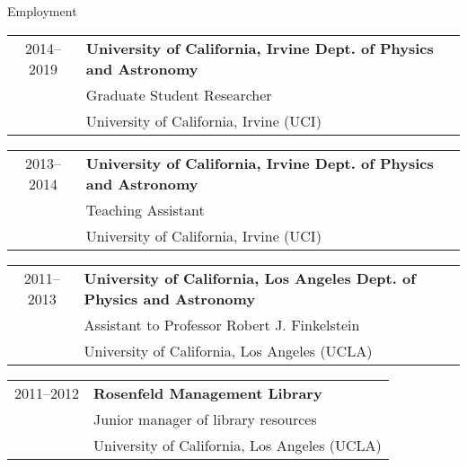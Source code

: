 \vspace{0.35in}
{\Large Employment}\\
\HRule
\vspace{0.25in}

\hspace{0.18in}
\begin{tabular}{c|l}
     2014--2019 & {\bf{University of California, Irvine Dept. of Physics and Astronomy}} \\
              & Graduate Student Researcher \\
              & University of California, Irvine (UCI) %
\end{tabular}

\vspace{0.1in}
\hspace{0.18in}
\begin{tabular}{c|l}
    2013--2014 & {\bf{University of California, Irvine Dept. of Physics and Astronomy}} \\
              & Teaching Assistant \\
              & University of California, Irvine (UCI) %
\end{tabular}

\vspace{0.1in}
\hspace{0.18in}
\begin{tabular}{c|l}
    2011--2013 & {\bf{University of California, Los Angeles Dept. of Physics and Astronomy}} \\
              & Assistant to Professor Robert J. Finkelstein \\
              & University of California, Los Angeles (UCLA) %
\end{tabular}

\vspace{0.1in}
\hspace{0.18in}
\begin{tabular}{c|l}
   2011--2012 & {\bf{Rosenfeld Management Library}} \\
             & Junior manager of library resources \\%
             & University of California, Los Angeles (UCLA) %
\end{tabular}

